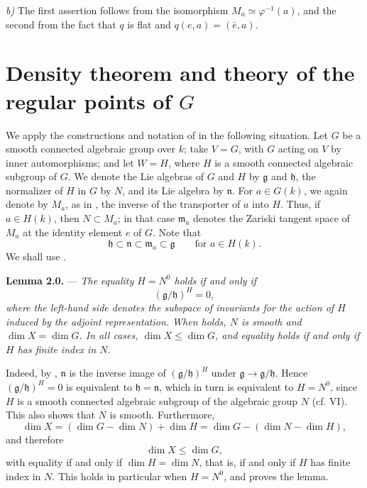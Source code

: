 \textit{b)} The first assertion follows from the isomorphism
\(M_a\simeq\varphi^{-1}(a)\), and the second from the fact that \(q\)
is flat and \(q(e,a)=(\bar e,a)\).

\section{Density theorem and theory of the regular points of \(G\)}

We apply the constructions and notation of  in
the following situation. Let \(G\) be a smooth connected algebraic
group over \(k\); take \(V=G\), with \(G\) acting on \(V\) by inner
automorphisms; and let \(W=H\), where \(H\) is a smooth connected
algebraic subgroup of \(G\). We denote the Lie algebras of \(G\) and
\(H\) by \(\mathfrak g\) and \(\mathfrak h\), the normalizer of \(H\)
in \(G\) by \(N\), and its Lie algebra by \(\mathfrak n\). For
\(a\in G(k)\), we again denote by \(M_a\), as in , the
inverse of the transporter of \(a\) into \(H\). Thus, if
\(a\in H(k)\), then \(N\subset M_a\); in that case
\(\mathfrak m_a\) denotes the Zariski tangent space of \(M_a\) at the
identity element \(e\) of \(G\). Note that
\[
  \mathfrak h\subset\mathfrak n\subset\mathfrak m_a
  \subset\mathfrak g
  \qquad\text{for }a\in H(k).
\]
We shall use .

\medskip
\noindent{}\textbf{Lemma 2.0.} ---
\textit{The equality \(H=N^0\) holds if and only if}
\[
  (\mathfrak g/\mathfrak h)^H=0,
\]
\textit{where the left-hand side denotes the subspace of invariants
for the action of \(H\) induced by the adjoint representation. When
 holds, \(N\) is smooth and \(\dim X=\dim G\). In all
cases, \(\dim X\leq\dim G\), and equality holds if and only if \(H\)
has finite index in \(N\).}

Indeed, by , \(\mathfrak n\) is the inverse image of
\((\mathfrak g/\mathfrak h)^H\) under
\(\mathfrak g\to\mathfrak g/\mathfrak h\). Hence
\((\mathfrak g/\mathfrak h)^H=0\) is equivalent to
\(\mathfrak h=\mathfrak n\), which in turn is equivalent to
\(H=N^0\), since \(H\) is a smooth connected algebraic subgroup of
the algebraic group \(N\) (cf. VI). This also shows that \(N\) is
smooth. Furthermore,
\[
  \dim X=(\dim G-\dim N)+\dim H
        =\dim G-(\dim N-\dim H),
\]
and therefore
\[
  \dim X\leq\dim G,
\]
with equality if and only if \(\dim H=\dim N\), that is, if and only
if \(H\) has finite index in \(N\). This holds in particular when
\(H=N^0\), and proves the lemma.

